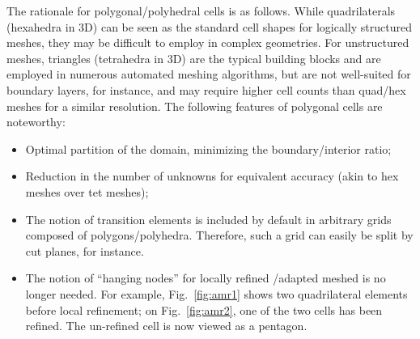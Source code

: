 \documentclass[preprint,10pt]{elsarticle}
\newcommand{\fig}[1]{Fig.~\ref{#1}}                      %
\renewcommand{\(}{\left(}
\renewcommand{\)}{\right)}
\renewcommand{\[}{\left[}
\renewcommand{\]}{\right]}
\begin{document}
The rationale for polygonal/polyhedral cells is as follows. 
While quadrilaterals (hexahedra in 3D) can be seen as the standard cell shapes for logically 
structured meshes, they may be difficult to employ in complex geometries. For unstructured meshes,
triangles (tetrahedra in 3D) are the typical building blocks and are employed in 
numerous automated meshing algorithms, but are not well-suited for boundary layers, 
for instance, and may require higher cell counts than quad/hex meshes for a similar
resolution.  The following features of polygonal cells are noteworthy:
\begin{itemize}
  \item Optimal partition of the domain, minimizing the boundary/interior ratio;
  \item Reduction in the number of unknowns for equivalent accuracy (akin to
	hex meshes over tet meshes);
	\item The notion of transition elements is included by default in arbitrary grids composed of
	polygons/polyhedra. Therefore, such a grid can easily be split by cut planes, for 
	instance. 
  \item The notion of ``hanging nodes'' for locally refined /adapted meshed is no longer needed.
	For example, \fig{fig:amr1} shows two quadrilateral elements before local refinement; on
	\fig{fig:amr2}, one of the two cells has been refined. The un-refined cell is now viewed as a
	pentagon.
\end{itemize}
\end{document}
